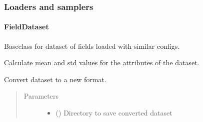 \documentclass[letterpaper,10pt,english]{sphinxmanual}
\begin{document}
\subsubsection{Loaders and samplers}
\label{\detokenize{api/datasets:loaders-and-samplers}}\label{\detokenize{api/datasets::doc}}

\paragraph{FieldDataset}
\label{\detokenize{api/datasets:fielddataset}}

\begin{fulllineitems}
\label{\detokenize{api/datasets:geology.datasets.FieldDataset}}
Baseclass for dataset of fields loaded with similar configs.

\begin{fulllineitems}
\label{\detokenize{api/datasets:geology.datasets.FieldDataset.calculate_statistics}}
Calculate mean and std values for the attributes of the dataset.

\end{fulllineitems}


\begin{fulllineitems}
\label{\detokenize{api/datasets:geology.datasets.FieldDataset.convert_to_other_fmt}}
Convert dataset to a new format.
\begin{quote}\begin{description}
\item[{Parameters}] \leavevmode\begin{itemize}
\item {} 
 () \textendash{} Directory to save converted dataset


\end{itemize}
\end{description}
\end{quote}
\end{fulllineitems}
\end{fulllineitems}
\end{document}
